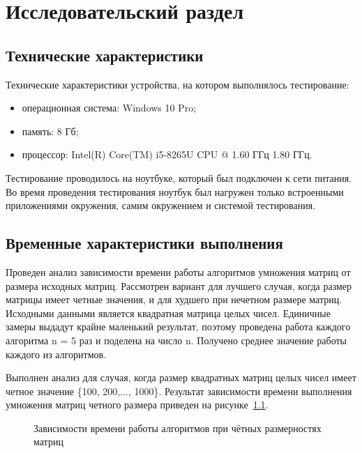\chapter{Исследовательский раздел}
\section{Технические характеристики}
Технические характеристики устройства, на котором выполнялось тестирование:
\begin{itemize}
	\item операционная система: Windows 10 Pro;
	\item память: 8 Гб;
	\item процессор: Intel(R) Core(TM) i5-8265U CPU @ 1.60 ГГц   1.80 ГГц.
\end{itemize}
Тестирование проводилось на ноутбуке, который был подключен к сети питания. Во время проведения тестирования ноутбук был нагружен только встроенными приложениями окружения, самим окружением и системой тестирования.

\section{Временные характеристики выполнения}
Проведен анализ зависимости времени работы алгоритмов умножения матриц от размера исходных матриц. Рассмотрен вариант для лучшего случая, когда размер матрицы имеет четные значения, и для худшего при нечетном размере матриц. Исходными данными является квадратная матрица целых чисел. Единичные замеры выдадут крайне маленький результат, поэтому проведена работа каждого алгоритма n = 5 раз и поделена на число n. Получено среднее значение работы каждого из алгоритмов. 

Выполнен анализ для случая, когда размер квадратных матриц целых чисел имеет четное значение \{100, 200,..., 1000\}. Результат зависимости времени выполнения умножения матриц четного размера приведен на рисунке~\ref{fg:6_1}.

\begin{figure}[H]
	\centering
	\caption{Зависимости времени работы алгоритмов при чётных размерностях матриц} 
	\label{fg:6_1}
\end{figure}

